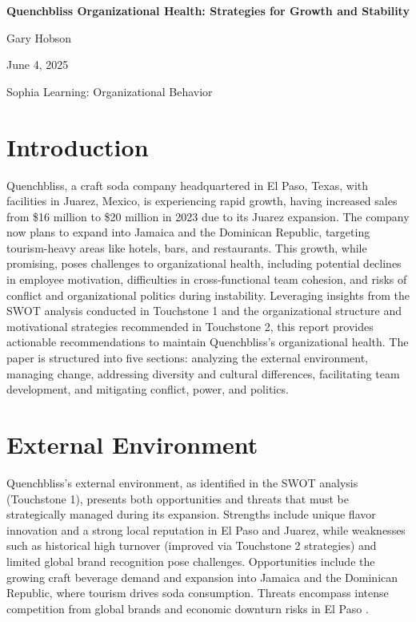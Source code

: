 \documentclass[12pt]{article}
\begin{document}
\begin{titlepage}
    \centering
    \vspace*{1in}
    {\LARGE\bfseries Quenchbliss Organizational Health: Strategies for Growth and Stability \par}
    \vspace{1in}
    {\large Gary Hobson \par}
    \vspace{0.5in}
    {\large June 4, 2025 \par}
    \vspace{0.5in}
    {\large Sophia Learning: Organizational Behavior \par}
\end{titlepage}

\section*{Introduction}
Quenchbliss, a craft soda company headquartered in El Paso, Texas, with facilities in Juarez, Mexico, is experiencing rapid growth, having increased sales from \$16 million to \$20 million in 2023 due to its Juarez expansion. The company now plans to expand into Jamaica and the Dominican Republic, targeting tourism-heavy areas like hotels, bars, and restaurants. This growth, while promising, poses challenges to organizational health, including potential declines in employee motivation, difficulties in cross-functional team cohesion, and risks of conflict and organizational politics during instability. Leveraging insights from the SWOT analysis conducted in Touchstone 1 and the organizational structure and motivational strategies recommended in Touchstone 2, this report provides actionable recommendations to maintain Quenchbliss’s organizational health. The paper is structured into five sections: analyzing the external environment, managing change, addressing diversity and cultural differences, facilitating team development, and mitigating conflict, power, and politics.

\section{External Environment}
Quenchbliss’s external environment, as identified in the SWOT analysis (Touchstone 1), presents both opportunities and threats that must be strategically managed during its expansion. Strengths include unique flavor innovation and a strong local reputation in El Paso and Juarez, while weaknesses such as historical high turnover (improved via Touchstone 2 strategies) and limited global brand recognition pose challenges. Opportunities include the growing craft beverage demand and expansion into Jamaica and the Dominican Republic, where tourism drives soda consumption. Threats encompass intense competition from global brands and economic downturn risks in El Paso \citep{sophia_env}.
\end{document}
